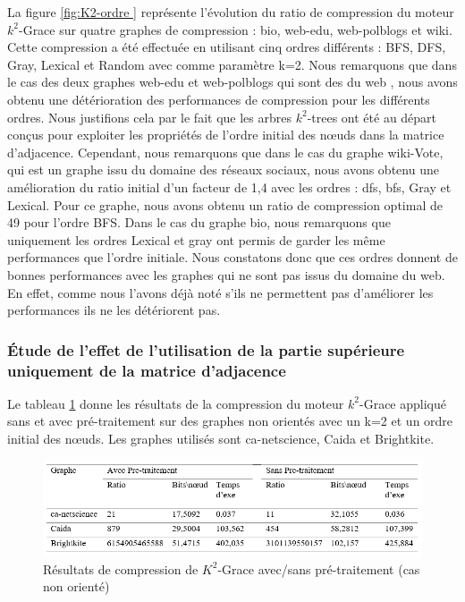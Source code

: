 La figure \ref{fig:K2-ordre } représente l'évolution du ratio de compression du moteur $k^2$-Grace sur quatre graphes de compression : bio, web-edu, web-polblogs et wiki. Cette compression a été effectuée en utilisant cinq ordres différents : BFS, DFS, Gray, Lexical et Random avec comme paramètre k=2. Nous remarquons que dans le cas des deux graphes web-edu et web-polblogs qui sont des du web , nous avons obtenu une détérioration des performances de compression pour les différents ordres. Nous justifions cela par le fait que les arbres $k^2$-trees ont été au départ conçus pour exploiter les propriétés de l'ordre initial des nœuds dans la matrice d'adjacence. Cependant, nous remarquons que dans le cas du graphe wiki-Vote, qui est un graphe issu du domaine des réseaux sociaux, nous avons obtenu une amélioration du ratio initial d'un facteur de 1,4 avec les ordres : \gls{dfs}, \gls{bfs}, Gray et Lexical. Pour ce graphe, nous avons obtenu un ratio de compression optimal de 49 pour l'ordre BFS. Dans le cas du graphe bio, nous remarquons que uniquement les ordres Lexical et gray ont permis de garder les même performances que l'ordre initiale. Nous constatons donc que ces ordres donnent de bonnes performances avec les graphes qui ne sont pas issus du domaine du web. En effet, comme nous l'avons déjà noté s'ils ne permettent pas d'améliorer les performances ils ne les détériorent pas.


\subsubsection{Étude de l'effet de l'utilisation de la partie supérieure uniquement de la matrice d'adjacence}


Le tableau \ref{fig:tab-pret } donne les résultats de la compression du moteur $k^2$-Grace appliqué sans et avec pré-traitement sur des graphes non orientés avec un k=2 et un ordre initial des nœuds. Les graphes utilisés sont ca-netscience, Caida et Brightkite. 
 

\begin{figure}[H]
	\centering
	\includegraphics[scale=0.9]{ressources/image/Tests/tab-pret.png}
	\caption{Résultats de compression de $K^2$-Grace avec/sans pré-traitement (cas non orienté)}
	\label{fig:tab-pret }
\end{figure}


